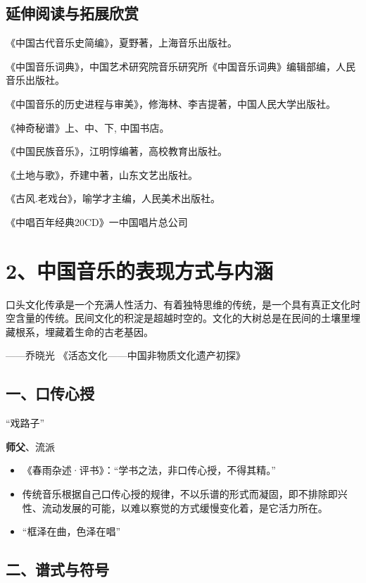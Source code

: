 \documentclass[
]{article}
\providecommand{\tightlist}{%
  \setlength{\itemsep}{0pt}\setlength{\parskip}{0pt}}
\begin{document}
\subsection{延伸阅读与拓展欣赏}\label{ux5ef6ux4f38ux9605ux8bfbux4e0eux62d3ux5c55ux6b23ux8d4f}

《中国古代音乐史简编》，夏野著，上海音乐出版社。

《中国音乐词典》，中国艺术研究院音乐研究所《中国音乐词典》编辑部编，人民音乐出版社。

《中国音乐的历史进程与审美》，修海林、李吉提著，中国人民大学出版社。

《神奇秘谱》上、中、下, 中国书店。

《中国民族音乐》，江明惇编著，高校教育出版社。

《土地与歌》，乔建中著，山东文艺出版社。

《古风.老戏台》，喻学才主编，人民美术出版社。

《中唱百年经典20CD》一中国唱片总公司

\section{2、中国音乐的表现方式与内涵}\label{ux4e2dux56fdux97f3ux4e50ux7684ux8868ux73b0ux65b9ux5f0fux4e0eux5185ux6db5}

口头文化传承是一个充满人性活力、有着独特思维的传统，是一个具有真正文化时空含量的传统。民间文化的积淀是超越时空的。文化的大树总是在民间的土壤里埋藏根系，埋藏着生命的古老基因。

------乔晓光 《活态文化------中国非物质文化遗产初探》

\subsection{一、口传心授}\label{ux4e00ux53e3ux4f20ux5fc3ux6388}

``戏路子''

\textbf{师父}、流派

\begin{itemize}
\tightlist
\item
  《春雨杂述·评书》：``学书之法，非口传心授，不得其精。''
\item
  传统音乐根据自己口传心授的规律，不以乐谱的形式而凝固，即不排除即兴性、流动发展的可能，以难以察觉的方式缓慢变化着，是它活力所在。
\item
  ``框泽在曲，色泽在唱''
\end{itemize}

\subsection{二、谱式与符号}\label{ux4e8cux8c31ux5f0fux4e0eux7b26ux53f7}
\end{document}
